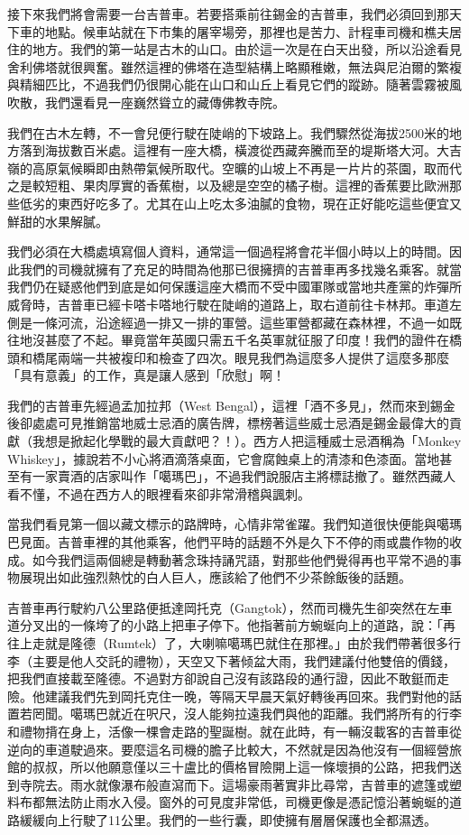 接下來我們將會需要一台吉普車。若要搭乘前往錫金的吉普車，我們必須回到那天下車的地點。候車站就在下市集的屠宰場旁，那裡也是苦力、計程車司機和樵夫居住的地方。我們的第一站是古木的山口。由於這一次是在白天出發，所以沿途看見舍利佛塔就很興奮。雖然這裡的佛塔在造型結構上略顯稚嫩，無法與尼泊爾的繁複與精細匹比，不過我們仍很開心能在山口和山丘上看見它們的蹤跡。隨著雲霧被風吹散，我們還看見一座巍然聳立的藏傳佛教寺院。

我們在古木左轉，不一會兒便行駛在陡峭的下坡路上。我們驟然從海拔2500米的地方落到海拔數百米處。這裡有一座大橋，橫渡從西藏奔騰而至的堤斯塔大河。大吉嶺的高原氣候瞬即由熱帶氣候所取代。空曠的山坡上不再是一片片的茶園，取而代之是較短粗、果肉厚實的香蕉樹，以及總是空空的橘子樹。這裡的香蕉要比歐洲那些低劣的東西好吃多了。尤其在山上吃太多油膩的食物，現在正好能吃這些便宜又鮮甜的水果解膩。

我們必須在大橋處填寫個人資料，通常這一個過程將會花半個小時以上的時間。因此我們的司機就擁有了充足的時間為他那已很擁擠的吉普車再多找幾名乘客。就當我們仍在疑惑他們到底是如何保護這座大橋而不受中國軍隊或當地共產黨的炸彈所威脅時，吉普車已經卡嗒卡嗒地行駛在陡峭的道路上，取右道前往卡林邦。車道左側是一條河流，沿途經過一排又一排的軍營。這些軍營都藏在森林裡，不過一如既往地沒甚麼了不起。畢竟當年英國只需五千名英軍就征服了印度！我們的證件在橋頭和橋尾兩端一共被複印和檢查了四次。眼見我們為這麼多人提供了這麼多那麼「具有意義」的工作，真是讓人感到「欣慰」啊！

我們的吉普車先經過孟加拉邦（West
Bengal），這裡「酒不多見」，然而來到錫金後卻處處可見推銷當地威士忌酒的廣告牌，標榜著這些威士忌酒是錫金最偉大的貢獻（我想是掀起化學戰的最大貢獻吧？！）。西方人把這種威士忌酒稱為「Monkey
Whiskey」，據說若不小心將酒滴落桌面，它會腐蝕桌上的清漆和色漆面。當地甚至有一家賣酒的店家叫作「噶瑪巴」，不過我們說服店主將標誌撤了。雖然西藏人看不懂，不過在西方人的眼裡看來卻非常滑稽與諷刺。

當我們看見第一個以藏文標示的路牌時，心情非常雀躍。我們知道很快便能與噶瑪巴見面。吉普車裡的其他乘客，他們平時的話題不外是久下不停的雨或農作物的收成。如今我們這兩個總是轉動著念珠持誦咒語，對那些他們覺得再也平常不過的事物展現出如此強烈熱忱的白人巨人，應該給了他們不少茶餘飯後的話題。

吉普車再行駛約八公里路便抵達岡托克（Gangtok），然而司機先生卻突然在左車道分叉出的一條垮了的小路上把車子停下。他指著前方蜿蜒向上的道路，說：「再往上走就是隆德（Rumtek）了，大喇嘛噶瑪巴就住在那裡。」由於我們帶著很多行李（主要是他人交託的禮物），天空又下著倾盆大雨，我們建議付他雙倍的價錢，把我們直接載至隆德。不過對方卻說自己沒有該路段的通行證，因此不敢鋌而走險。他建議我們先到岡托克住一晚，等隔天早晨天氣好轉後再回來。我們對他的話置若罔聞。噶瑪巴就近在呎尺，沒人能夠拉遠我們與他的距離。我們將所有的行李和禮物揹在身上，活像一棵會走路的聖誕樹。就在此時，有一輛沒載客的吉普車從逆向的車道駛過來。要麼這名司機的膽子比較大，不然就是因為他沒有一個經營旅館的叔叔，所以他願意僅以三十盧比的價格冒險開上這一條壞損的公路，把我們送到寺院去。雨水就像瀑布般直瀉而下。這場豪雨著實非比尋常，吉普車的遮篷或塑料布都無法防止雨水入侵。窗外的可見度非常低，司機更像是憑記憶沿著蜿蜒的道路緩緩向上行駛了11公里。我們的一些行囊，即使擁有層層保護也全都濕透。


